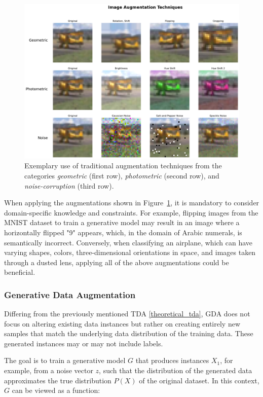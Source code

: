 \begin{figure}[htbp]
    \centering
    \includegraphics[width=.9\textwidth]{abb/traditional_image_augmentation_examples.png}
    \caption{Exemplary use of traditional augmentation techniques from the categories \textit{geometric} (first row), \textit{photometric} (second row), and \textit{noise-corruption} (third row).}
    \label{fig:figure_tda_examples}
\end{figure}

\noindent
When applying the augmentations shown in Figure~\ref{fig:figure_tda_examples}, it is mandatory to consider domain-specific knowledge and constraints. For example, flipping images from the MNIST dataset to train a generative model may result in an image where a horizontally flipped "9" appears, which, in the domain of Arabic numerals, is semantically incorrect. Conversely, when classifying an airplane, which can have varying shapes, colors, three-dimensional orientations in space, and images taken through a dusted lens, applying all of the above augmentations could be beneficial.


\subsubsection[Generative Data Augmentation - GDA]{Generative Data Augmentation}\label{theoretical_gda}
Differing from the previously mentioned TDA \ref{theoretical_tda}, GDA does not focus on altering existing data instances but rather on creating entirely new samples that match the underlying data distribution of the training data. These generated instances may or may not include labels.

The goal is to train a generative model \( G \) that produces instances \( X_1 \), for example, from a noise vector \( z \), such that the distribution of the generated data approximates the true distribution \( P(X) \) of the original dataset. In this context, \( G \) can be viewed as a function:

